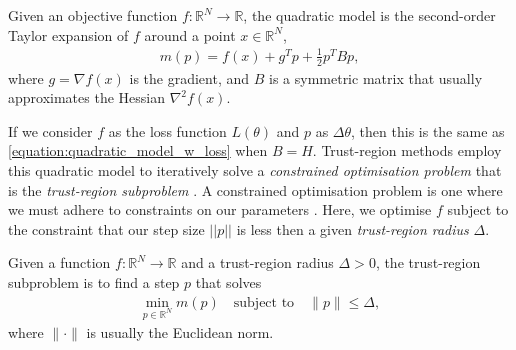 \begin{definition}
    Given an objective function $f: \mathbb{R}^N \to \mathbb{R}$, the quadratic model is the second-order Taylor expansion of $f$ around a point $x \in \mathbb{R}^N$,
    \begin{align}
    m(p) = f(x) + g^T p + \frac{1}{2} p^T B p,
    \label{eq:tr_quadratic_model}
    \end{align}
    where $g = \nabla f(x)$ is the gradient, and $B$ is a symmetric matrix that usually approximates the Hessian $\nabla^2 f(x)$.
\end{definition}
If we consider $f$ as the loss function $L(\theta)$ and $p$ as $\Delta \theta$, then this is the same as \cref{equation:quadratic_model_w_loss} when $B = H$. Trust-region methods employ this quadratic model to iteratively solve a \textit{constrained optimisation problem} that is the \textit{trust-region subproblem} \citep{NoceWrig06}. A constrained optimisation problem is one where we must adhere to constraints on our parameters \citep{cvbook}. Here, we optimise $f$ subject to the constraint that our step size $||p||$ is less then a given \textit{trust-region radius} $\Delta$.

\begin{definition}
    Given a function $f: \mathbb{R}^N \to \mathbb{R}$ and a trust-region radius $\Delta > 0$, the trust-region subproblem is to find a step $p$ that solves
    \begin{align}
        \min_{p \in \mathbb{R}^N} m(p) \quad \text{subject to} \quad \|p\| \leq \Delta,
        \label{eq:tr_subproblem}
    \end{align}
    where $\| \cdot \|$ is usually the Euclidean norm.
\end{definition}


